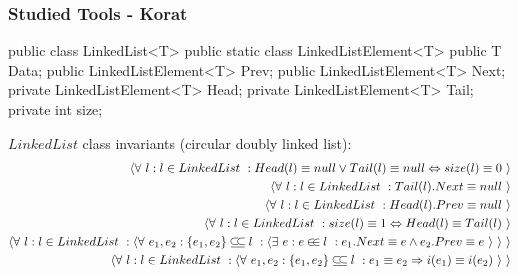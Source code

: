 \documentclass{beamer}
\begin{document}
\def\t#1#2#3#4{\langle#1 \ #2 : #3 \ : #4 \ \rangle}
\def\d#1#2#3{\langle#1 \ #2 :: #3 \ \rangle}
\newcommand{\subseteqL}{\mathbin{\subseteq\mkern-4mu\subseteq}}
\newcommand{\inL}{\mathbin{\in\mkern-4mu\in}}

\begin{frame}[fragile]\frametitle{Studied Tools - Korat}
\begin{code}
public class LinkedList<T> {
  public static class LinkedListElement<T> {
    public T Data;
    public LinkedListElement<T> Prev;
    public LinkedListElement<T> Next;
  }
  private LinkedListElement<T> Head;
  private LinkedListElement<T> Tail;
  private int size; 
}
\end{code}
$LinkedList$ class invariants (circular doubly linked list):
{\tiny
\begin{eqnarray}
\t \forall {l} {l \in LinkedList} {Head(l) \equiv null \vee Tail(l) \equiv null \Leftrightarrow size(l) \equiv 0}\\
\t \forall {l} {l \in LinkedList} {Tail(l).Next \equiv null}\\
\t \forall {l} {l \in LinkedList} {Head(l).Prev \equiv null}\\
\t \forall {l} {l \in LinkedList} {size(l) \equiv 1 \Leftrightarrow Head(l) \equiv Tail(l)}\\
\t \forall {l} {l \in LinkedList} {\t \forall {e_1,e_2} {\{e_1,e_2\} \subseteqL l} {\t \exists {e} {e \inL l} {e_1.Next \equiv e \wedge e_2.Prev \equiv e}}\label{eq:linked}}\\
\t \forall {l} {l \in LinkedList} {\t \forall {e_1,e_2} {\{e_1,e_2\} \subseteqL l} {e_1 \equiv e_2 \Rightarrow i(e_1) \equiv i(e_2)}\label{eq:uniq}}
\end{eqnarray}
}
\end{frame}
\end{document}
